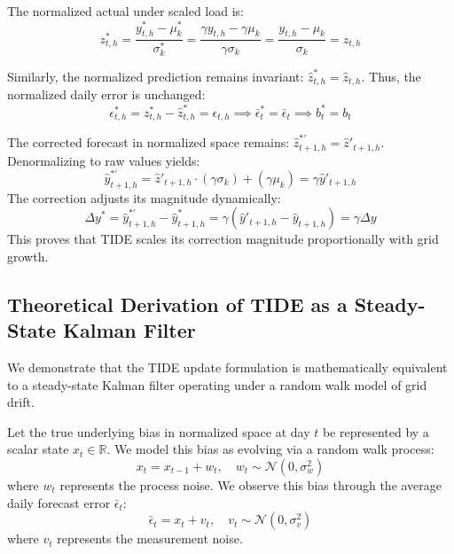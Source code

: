 \documentclass[journal]{IEEEtran}
\begin{document}
The normalized actual under scaled load is:
\begin{equation}
z^*_{t,h} = \frac{y^*_{t,h} - \mu^*_k}{\sigma^*_k} = \frac{\gamma y_{t,h} - \gamma \mu_k}{\gamma \sigma_k} = \frac{y_{t,h} - \mu_k}{\sigma_k} = z_{t,h}
\end{equation}

Similarly, the normalized prediction remains invariant: $\hat{z}^*_{t,h} = \hat{z}_{t,h}$. Thus, the normalized daily error is unchanged:
\begin{equation}
\epsilon^*_{t,h} = z^*_{t,h} - \hat{z}^*_{t,h} = \epsilon_{t,h} \implies \bar{\epsilon}^*_t = \bar{\epsilon}_t \implies b^*_t = b_t
\end{equation}

The corrected forecast in normalized space remains: $\hat{z}^{*'}_{t+1,h} = \hat{z}'_{t+1,h}$. Denormalizing to raw values yields:
\begin{equation}
\hat{y}^{*'}_{t+1,h} = \hat{z}'_{t+1,h} \cdot (\gamma \sigma_k) + (\gamma \mu_k) = \gamma \hat{y}'_{t+1,h}
\end{equation}
The correction adjusts its magnitude dynamically:
\begin{equation}
\Delta y^* = \hat{y}^{*'}_{t+1,h} - \hat{y}^*_{t+1,h} = \gamma (\hat{y}'_{t+1,h} - \hat{y}_{t+1,h}) = \gamma \Delta y
\end{equation}
This proves that TIDE scales its correction magnitude proportionally with grid growth.

\subsection{Theoretical Derivation of TIDE as a Steady-State Kalman Filter}
We demonstrate that the TIDE update formulation is mathematically equivalent to a steady-state Kalman filter operating under a random walk model of grid drift.

Let the true underlying bias in normalized space at day $t$ be represented by a scalar state $x_t \in \mathbb{R}$. We model this bias as evolving via a random walk process:
\begin{equation}
x_t = x_{t-1} + w_t, \quad w_t \sim \mathcal{N}(0, \sigma_w^2)
\end{equation}
where $w_t$ represents the process noise. We observe this bias through the average daily forecast error $\bar{\epsilon}_t$:
\begin{equation}
\bar{\epsilon}_t = x_t + v_t, \quad v_t \sim \mathcal{N}(0, \sigma_v^2)
\end{equation}
where $v_t$ represents the measurement noise.
\end{document}
